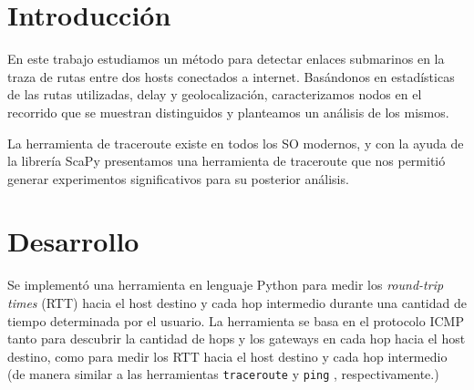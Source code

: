 \documentclass[a4paper, 10pt, twoside]{article}
\begin{document}
\newpage




\tableofcontents

\newpage




\section{Introducción}

En este trabajo estudiamos un método para detectar enlaces submarinos en la traza de rutas entre dos hosts conectados a internet. Basándonos en estadísticas de las rutas utilizadas, delay y geolocalización, caracterizamos nodos en el recorrido que se muestran distinguidos y planteamos un análisis de los mismos.

La herramienta de traceroute existe en todos los SO modernos, y con la ayuda de la librería ScaPy presentamos una herramienta de traceroute que nos permitió generar experimentos significativos para su posterior análisis.




\section{Desarrollo}

Se implementó una herramienta en lenguaje Python para medir los \emph{round-trip times} (RTT) hacia el host destino y cada hop intermedio durante una cantidad de tiempo determinada por el usuario. La herramienta se basa en el protocolo ICMP \cite{rfc-792} tanto para descubrir la cantidad de hops y los gateways en cada hop hacia el host destino, como para medir los RTT hacia el host destino y cada hop intermedio (de manera similar a las herramientas \texttt{traceroute} \cite{wiki-traceroute} y \texttt{ping} \cite{wiki-ping}, respectivamente.)
\end{document}
